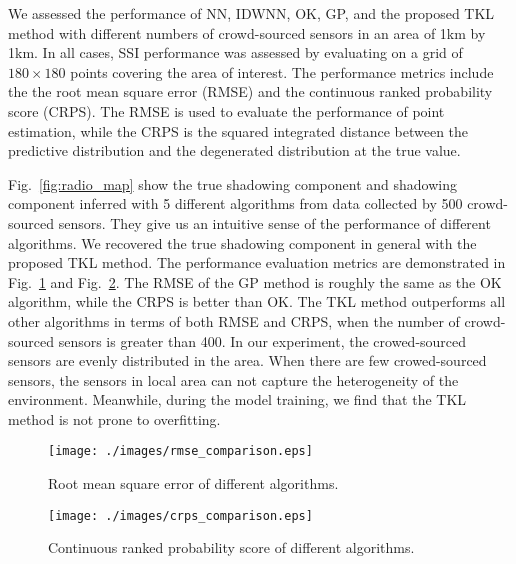 \documentclass[journal, oneside, twocolumn]{IEEEtran}
\begin{document}
We assessed the performance of NN, IDWNN, OK, GP, and the proposed TKL method with different numbers of crowd-sourced sensors in an area of 1km by 1km. In all cases, SSI performance was assessed by evaluating on a grid of $180\times180$ points covering the area of interest. The performance metrics include the the root mean square error (RMSE) and the continuous ranked probability score (CRPS)\cite{Gneiting2007}. The RMSE is used to evaluate the performance of point estimation, while the CRPS is the squared integrated distance between the predictive distribution and the degenerated distribution at the true value.

Fig.~\ref{fig:radio_map} show the true shadowing component and shadowing component inferred with 5 different algorithms from data collected by 500 crowd-sourced sensors. They give us an intuitive sense of the performance of different algorithms. We recovered the true shadowing component in general with the proposed TKL method.
The performance evaluation metrics are demonstrated in Fig.~\ref{fig:rmse} and Fig.~\ref{fig:crps}. The RMSE of the GP method is roughly the same as the OK algorithm, while the CRPS is better than OK. The TKL method outperforms all other algorithms in terms of both RMSE and CRPS, when the number of crowd-sourced sensors is greater than 400. In our experiment, the crowed-sourced sensors are evenly distributed in the area. When there are few crowed-sourced sensors, the sensors in local area can not capture the heterogeneity of the environment. Meanwhile, during the model training, we find that the TKL method is not prone to overfitting.


\begin{figure}[!tb]
  \centering
  \texttt{[image: ./images/rmse\_comparison.eps]}
  \caption{Root mean square error of different algorithms.}
  \label{fig:rmse}
\end{figure}

\begin{figure}[!tb]
  \centering
  \texttt{[image: ./images/crps\_comparison.eps]}
  \caption{Continuous ranked probability score of different algorithms.}
  \label{fig:crps}
\end{figure}
\end{document}
